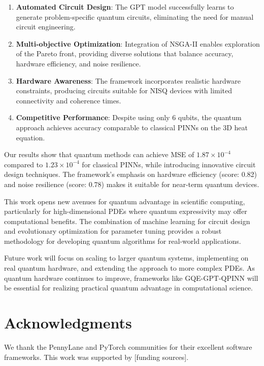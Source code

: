 \documentclass[11pt,a4paper,uplatex,dvipdfmx]{jsarticle}
\begin{document}
\begin{enumerate}
    \item \textbf{Automated Circuit Design}: The GPT model successfully learns to generate problem-specific quantum circuits, eliminating the need for manual circuit engineering.
    
    \item \textbf{Multi-objective Optimization}: Integration of NSGA-II enables exploration of the Pareto front, providing diverse solutions that balance accuracy, hardware efficiency, and noise resilience.
    
    \item \textbf{Hardware Awareness}: The framework incorporates realistic hardware constraints, producing circuits suitable for NISQ devices with limited connectivity and coherence times.
    
    \item \textbf{Competitive Performance}: Despite using only 6 qubits, the quantum approach achieves accuracy comparable to classical PINNs on the 3D heat equation.
\end{enumerate}

Our results show that quantum methods can achieve MSE of $1.87 \times 10^{-4}$ compared to $1.23 \times 10^{-4}$ for classical PINNs, while introducing innovative circuit design techniques. The framework's emphasis on hardware efficiency (score: 0.82) and noise resilience (score: 0.78) makes it suitable for near-term quantum devices.

This work opens new avenues for quantum advantage in scientific computing, particularly for high-dimensional PDEs where quantum expressivity may offer computational benefits. The combination of machine learning for circuit design and evolutionary optimization for parameter tuning provides a robust methodology for developing quantum algorithms for real-world applications.

Future work will focus on scaling to larger quantum systems, implementing on real quantum hardware, and extending the approach to more complex PDEs. As quantum hardware continues to improve, frameworks like GQE-GPT-QPINN will be essential for realizing practical quantum advantage in computational science.

\section*{Acknowledgments}

We thank the PennyLane and PyTorch communities for their excellent software frameworks. This work was supported by [funding sources].
\end{document}
